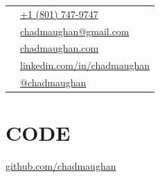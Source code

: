 \documentclass[letterpaper]{article}
\begin{document}


\begin{minipage}[t]{2in} 
\begin{flushleft}


\begin{tabular}{c|p{8cm}}
	\faPhone				 		    & \href{tel:+18017479747}{+1 (801) 747-9747} 				    \\ [.3ex] %
	\faEnvelope		 			        & \href{mailto:chadmaughan@gmail.com}{chadmaughan@gmail.com} 	\\ [.3ex] %
	\faGlobe						    & \href{https://chadmaughan.com}{chadmaughan.com} 		        \\ [.3ex] %
	\faLinkedin						    & \href{https://www.linkedin.com/in/chadmaughan}{linkedin.com/in/chadmaughan} 	\\ [.3ex] %
	\faXTwitter						    & \href{https://x.com/chadmaughan}{@chadmaughan} %
\end{tabular}

\vspace{0.05in}

\section*{CODE}
\href{https://github.com/chadmaughan}{github.com/chadmaughan}

\vspace{0.05in}


\end{flushleft}
\end{minipage}
\end{document}
